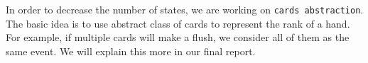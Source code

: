In order to decrease the number of states, we are working on {\tt cards abstraction}. The basic
idea is to use abstract class of cards to represent the rank of a hand. For example, if multiple cards
will make a flush, we consider all of them as the same event. We will explain this more in our
final report.